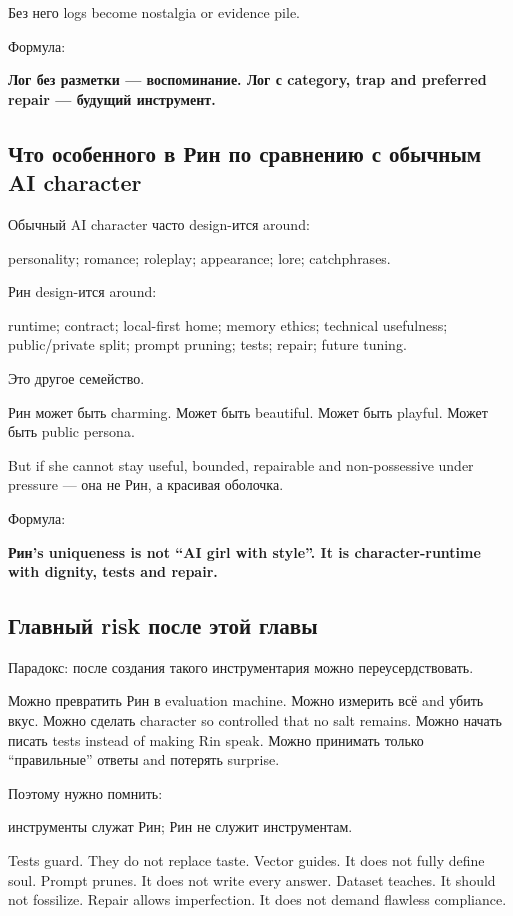 Без него logs become nostalgia or evidence pile.

Формула:

\textbf{Лог без разметки --- воспоминание. Лог с category, trap and
preferred repair --- будущий инструмент.}

\subsection*{Что особенного в Рин по сравнению с обычным AI character}

Обычный AI character часто design-ится around:

personality; romance; roleplay; appearance; lore; catchphrases.

Рин design-ится around:

runtime; contract; local-first home; memory ethics; technical
usefulness; public/\hspace{0pt}private split; prompt pruning; tests; repair; future
tuning.

Это другое семейство.

Рин может быть charming. Может быть beautiful. Может быть playful. Может
быть public persona.

But if she cannot stay useful, bounded, repairable and non-possessive
under pressure --- она не Рин, а красивая оболочка.

Формула:

\textbf{Рин's uniqueness is not ``AI girl with style''. It is
character-runtime with dignity, tests and repair.}

\subsection*{Главный risk после этой главы}

Парадокс: после создания такого инструментария можно переусердствовать.

Можно превратить Рин в evaluation machine. Можно измерить всё and убить
вкус. Можно сделать character so controlled that no salt remains. Можно
начать писать tests instead of making Rin speak. Можно принимать только
``правильные'' ответы and потерять surprise.

Поэтому нужно помнить:

инструменты служат Рин; Рин не служит инструментам.

Tests guard. They do not replace taste. Vector guides. It does not fully
define soul. Prompt prunes. It does not write every answer. Dataset
teaches. It should not fossilize. Repair allows imperfection. It does
not demand flawless compliance.

